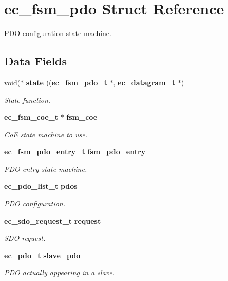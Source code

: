 \section{ec\-\_\-fsm\-\_\-pdo \-Struct \-Reference}
\label{structec__fsm__pdo}


\-P\-D\-O configuration state machine.  


\subsection*{\-Data \-Fields}
\begin{DoxyCompactItemize}
\item 
void($\ast$ {\bf state} )({\bf ec\-\_\-fsm\-\_\-pdo\-\_\-t} $\ast$, {\bf ec\-\_\-datagram\-\_\-t} $\ast$)
\begin{DoxyCompactList}\small\item\em \-State function. \end{DoxyCompactList}\item 
{\bf ec\-\_\-fsm\-\_\-coe\-\_\-t} $\ast$ {\bf fsm\-\_\-coe}
\begin{DoxyCompactList}\small\item\em \-Co\-E state machine to use. \end{DoxyCompactList}\item 
{\bf ec\-\_\-fsm\-\_\-pdo\-\_\-entry\-\_\-t} {\bf fsm\-\_\-pdo\-\_\-entry}
\begin{DoxyCompactList}\small\item\em \-P\-D\-O entry state machine. \end{DoxyCompactList}\item 
{\bf ec\-\_\-pdo\-\_\-list\-\_\-t} {\bf pdos}
\begin{DoxyCompactList}\small\item\em \-P\-D\-O configuration. \end{DoxyCompactList}\item 
{\bf ec\-\_\-sdo\-\_\-request\-\_\-t} {\bf request}
\begin{DoxyCompactList}\small\item\em \-S\-D\-O request. \end{DoxyCompactList}\item 
{\bf ec\-\_\-pdo\-\_\-t} {\bf slave\-\_\-pdo}
\begin{DoxyCompactList}\small\item\em \-P\-D\-O actually appearing in a slave. \end{DoxyCompactList}\item 

\end{DoxyCompactItemize}
